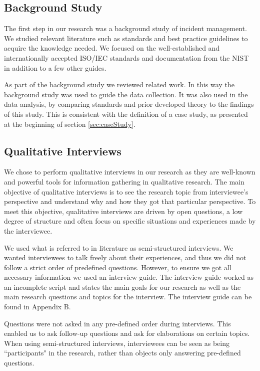 \subsection{Background Study}
\label{sec:background}
The first step in our research was a background study of incident management. We studied relevant literature such as standards and best practice guidelines to acquire the knowledge needed. We focused on the well-established and internationally accepted ISO/IEC standards and documentation from the \ac{NIST} in addition to a few other guides.

As part of the background study we reviewed related work. In this way the background study was used to guide the data collection. It was also used in the data analysis, by comparing standards and prior developed theory to the findings of this study. This is consistent with the definition of a case study, as presented at the beginning of section \ref{sec:caseStudy}.

\subsection{Qualitative Interviews}
\label{sec:interviews}
We chose to perform qualitative interviews in our research as they are well-known and powerful tools for information gathering in qualitative research\cite{myers2007qualitative}. The main objective of qualitative interviews is to see the research topic from interviewee's perspective and understand why and how they got that particular perspective\cite{cassell2004essential}. To meet this objective, qualitative interviews are driven by open questions, a low degree of structure and often focus on specific situations and experiences made by the interviewee. 

We used what is referred to in literature as semi-structured interviews\cite{cassell2004essential}. We wanted interviewees to talk freely about their experiences, and thus we did not follow a strict order of predefined questions. However, to ensure we got all necessary information we used an interview guide. The interview guide worked as an incomplete script and states the main goals for our research as well as the main research questions and topics for the interview. The interview guide can be found in Appendix B.

Questions were not asked in any pre-defined order during interviews. This enabled us to ask follow-up questions and ask for elaborations on certain topics. When using semi-structured interviews, interviewees can be seen as being ``participants" in the research, rather than objects only answering pre-defined questions.

